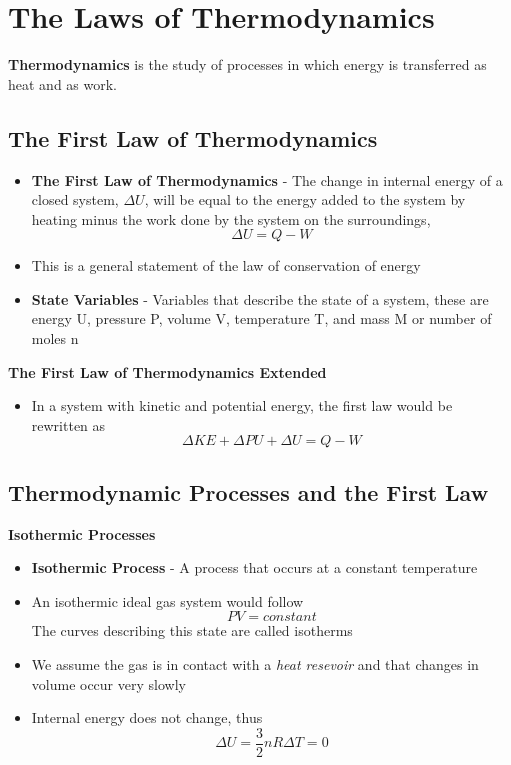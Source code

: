 \section{The Laws of Thermodynamics}
\textbf{Thermodynamics} is the study of processes in which energy is transferred as heat and as work. 

\subsection{The First Law of Thermodynamics}
\begin{itemize}
    \item \textbf{The First Law of Thermodynamics} - The change in internal energy of a closed system, \(\Delta U\), will be equal to the energy added to the system by heating minus the work done by the system on the surroundings, \[\Delta U=Q-W\]
    \item This is a general statement of the law of conservation of energy
    \item \textbf{State Variables} - Variables that describe the state of a system, these are energy U, pressure P, volume V, temperature T, and mass M or number of moles n
\end{itemize}

\textbf{The First Law of Thermodynamics Extended}
\begin{itemize}
    \item In a system with kinetic and potential energy, the first law would be rewritten  as \[\Delta KE+\Delta PU+\Delta U=Q-W\]
\end{itemize}

\subsection{Thermodynamic Processes and the First Law}
\textbf{Isothermic Processes}
\begin{itemize}
    \item \textbf{Isothermic Process} - A process that occurs at a constant temperature
    \item An isothermic ideal gas system would follow \[PV=constant\] The curves describing this state are called isotherms
    \item We assume the gas is in contact with a \emph{heat resevoir} and that changes in volume occur very slowly
    \item Internal energy does not change, thus \[\Delta U=\frac{3}{2}nR\Delta T=0\]
\end{itemize}

